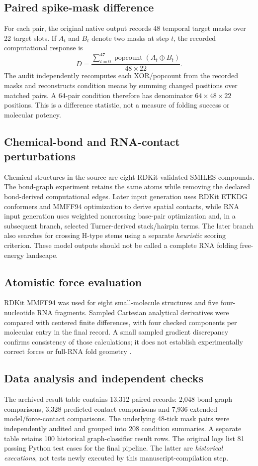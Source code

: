 \documentclass[10pt,a4paper]{article}
\begin{document}
\subsection{Paired spike-mask difference}
For each pair, the original native output records 48 temporal target masks over 22 target slots. If $A_t$ and $B_t$ denote two masks at step $t$, the recorded computational response is
\begin{equation}\label{eq:disagreement}D=\frac{\sum_{t=0}^{47}\operatorname{popcount}(A_t\oplus B_t)}{48\times22}.\end{equation}
The audit independently recomputes each XOR/popcount from the recorded masks and reconstructs condition means by summing changed positions over matched pairs. A 64-pair condition therefore has denominator $64\times48\times22$ positions. This is a difference statistic, not a measure of folding success or molecular potency.

\subsection{Chemical-bond and RNA-contact perturbations}
Chemical structures in the source are eight RDKit-validated SMILES compounds. The bond-graph experiment retains the same atoms while removing the declared bond-derived computational edges. Later input generation uses RDKit ETKDG conformers and MMFF94 optimization to derive spatial contacts, while RNA input generation uses weighted noncrossing base-pair optimization and, in a subsequent branch, selected Turner-derived stack/hairpin terms. The later branch also searches for crossing H-type stems using a separate \emph{heuristic} scoring criterion. These model outputs should not be called a complete RNA folding free-energy landscape.

\subsection{Atomistic force evaluation}
RDKit MMFF94 was used for eight small-molecule structures and five four-nucleotide RNA fragments. Sampled Cartesian analytical derivatives were compared with centered finite differences, with four checked components per molecular entry in the final record. A small sampled gradient discrepancy confirms consistency of those calculations; it does not establish experimentally correct forces or full-RNA fold geometry \cite{RDKit}.

\subsection{Data analysis and independent checks}
The archived result table contains 13,312 paired records: 2,048 bond-graph comparisons, 3,328 predicted-contact comparisons and 7,936 extended model/force-contact comparisons. The underlying 48-tick mask pairs were independently audited and grouped into 208 condition summaries. A separate table retains 100 historical graph-classifier result rows. The original logs list 81 passing Python test cases for the final pipeline. The latter are \emph{historical executions}, not tests newly executed by this manuscript-compilation step.
\end{document}

